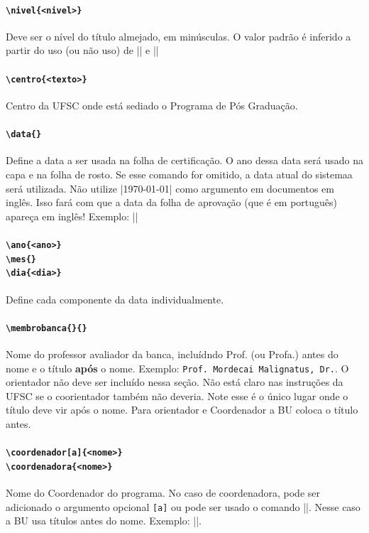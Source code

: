 \documentclass[embeddedlogo]{ufsc-thesis-rn46-2019}
\begin{document}
\paragraph*{\texttt{\textbackslash{}nivel\{<nivel>\}}} Deve ser o nível do título almejado, em minúsculas. O valor padrão é inferido a partir do uso (ou não uso) de \mt|\tese| e \mt|\dissertacao|

\paragraph*{\texttt{\textbackslash{}centro\{<texto>\}}} Centro da UFSC onde está sediado o Programa de Pós Graduação.

\paragraph*{\texttt{\textbackslash{}data\{<data por extenso>\}}} 
Define a data a ser usada na folha de certificação. O ano dessa data será usado na capa e na folha de rosto. Se esse comando for omitido, a data atual do sistemaa será utilizada. Não utilize \mt|\today| como argumento em documentos em inglês. Isso fará com que a data da folha de aprovação (que é em português) apareça em inglês!
Exemplo: \mt||

\paragraph*{\texttt{\textbackslash{}ano\{<ano>\}}\\  
            \texttt{\textbackslash{}mes\{<nome do mes>\}} \\
            \texttt{\textbackslash{}dia\{<dia>\}}} 
Define cada componente da data individualmente.


\paragraph*{\texttt{\textbackslash{}membrobanca\{<nome com títulos>\}\{<universidade por extenso>\}}} 
Nome do professor avaliador da banca, incluídndo Prof. (ou Profa.) antes do nome e o título \textbf{após} o nome. Exemplo: \texttt{Prof. Mordecai Malignatus, Dr.}. O orientador não deve ser incluído nessa seção. Não está claro nas instruções da UFSC se o coorientador também não deveria. Note esse é o único lugar onde o título deve vir após o nome. Para orientador e Coordenador a BU coloca o título antes.

\paragraph*{\texttt{\textbackslash{}coordenador[a]\{<nome>\}} \\
            \texttt{\textbackslash{}coordenadora\{<nome>\}}} 
Nome do Coordenador do programa. No caso de coordenadora, pode ser adicionado o argumento opcional \texttt{[a]} ou pode ser usado o comando \mt|\coordenadora|. Nesse caso a BU usa títulos antes do nome. Exemplo: \mt||.
\end{document}
